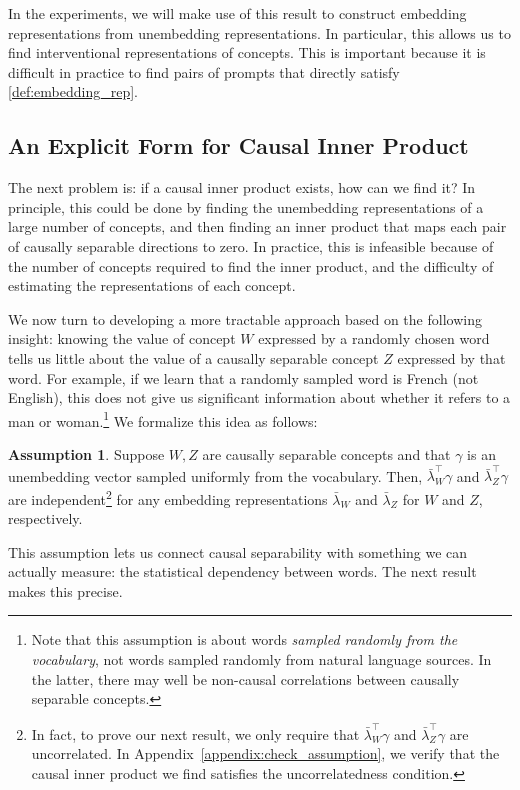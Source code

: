 \documentclass{article}
\theoremstyle{plain}
\theoremstyle{definition}
\newtheorem{assumption}[theorem]{Assumption}
\theoremstyle{remark}
\begin{document}
In the experiments, we will make use of this result to construct embedding representations from unembedding representations. In particular, this allows us to find interventional representations of concepts. This is important because it is difficult in practice to find pairs of prompts that directly satisfy \cref{def:embedding_rep}.

\subsection{An Explicit Form for Causal Inner Product}
The next problem is: if a causal inner product exists, how can we find it?
In principle, this could be done by finding the unembedding representations of a large number of concepts, and then finding an inner product that maps each pair of causally separable directions to zero.
In practice, this is infeasible because of the number of concepts required to find the inner product, and the difficulty of estimating the representations of each concept.

We now turn to developing a more tractable approach based on the following insight: knowing the value of concept $W$ expressed by a randomly chosen word tells us little about the value of a causally separable concept $Z$ expressed by that word.
For example, if we learn that a randomly sampled word is French (not English), this does not give us significant information about whether it refers to a man or woman.\footnote{Note that this assumption is about words \emph{sampled randomly from the vocabulary}, not words sampled randomly from natural language sources. In the latter, there may well be non-causal correlations between causally separable concepts.}
We formalize this idea as follows:
\begin{assumption}\label{ass:ortho_to_indep}
    Suppose $W,Z$ are causally separable concepts and that $\gamma$ is an unembedding vector sampled uniformly from the vocabulary. Then, $\bar{\lambda}_W^\top \gamma$ and $\bar{\lambda}_Z^\top \gamma$ are independent\footnote{In fact, to prove our next result, we only require that $\bar{\lambda}_W^\top \gamma$ and $\bar{\lambda}_Z^\top \gamma$ are uncorrelated. In Appendix~\ref{appendix:check_assumption}, we verify that the causal inner product we find satisfies the uncorrelatedness condition.} for any embedding representations $\bar{\lambda}_W$ and $\bar{\lambda}_Z$ for $W$ and $Z$, respectively.
\end{assumption}
This assumption lets us connect causal separability with something we can actually measure: the statistical dependency between words. The next result makes this precise.
\end{document}
